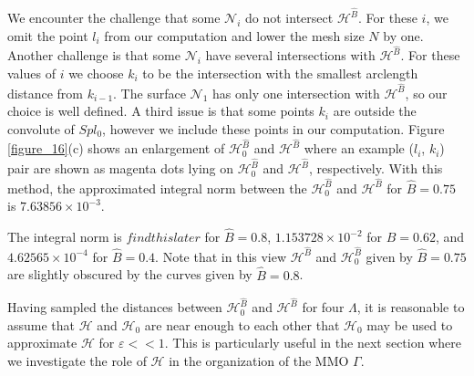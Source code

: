 \documentclass{ws-ijbc}
\begin{document}
We encounter the challenge that some $\mathscr{N}_i$ do not intersect $\mathscr{H}^{\widehat{B}}$.  For these $i$, we omit the point $l_i$ from our computation and lower the mesh size $N$ by one.  Another challenge is that some $\mathscr{N}_i$ have several intersections with $\mathscr{H}^{\widehat{B}}$.  For these values of $i$ we choose $k_i$ to be the intersection with the smallest arclength distance from $k_{i-1}$.  The surface $\mathscr{N}_1$ has only one intersection with $\mathscr{H}^{\widehat{B}}$, so our choice is well defined.  A third issue is that some points $k_i$ are outside the convolute of $Spl_0$, however we include these points in our computation.  Figure \ref{figure_16}(c) shows an enlargement of $\mathscr{H}_0^{\widehat{B}}$ and $\mathscr{H}^{\widehat{B}}$ where an example ($l_i$, $k_i$) pair are shown as magenta dots lying on $\mathscr{H}_0^{\widehat{B}}$ and $\mathscr{H}^{\widehat{B}}$, respectively.  With this method, the approximated integral norm between the $\mathscr{H}_0^{\widehat{B}}$ and $\mathscr{H}^{\widehat{B}}$ for $\widehat{B} = 0.75$ is $7.63856 \times 10^{-3}$.



























  The integral norm is $findthislater$ for $\widehat{B} = 0.8$, $1.153728 \times 10^{-2}$ for $\widehat{B} = 0.62$, and $4.62565 \times 10^{-4}$ for $\widehat{B} = 0.4$.  Note that in this view $\mathscr{H}^{\widehat{B}}$ and $\mathscr{H}_0^{\widehat{B}}$ given by $\widehat{B}=0.75$ are slightly obscured by the curves given by $\widehat{B}=0.8$.

Having sampled the distances between $\mathscr{H}_0^{\widehat{B}}$ and $\mathscr{H}^{\widehat{B}}$ for four $\Lambda$, it is reasonable to assume that $\mathscr{H}$ and $\mathscr{H}_0$ are near enough to each other that $\mathscr{H}_0$ may be used to approximate $\mathscr{H}$ for $\varepsilon << 1$.  This is particularly useful in the next section where we investigate the role of $\mathscr{H}$ in the organization of the MMO $\Gamma$.




\newpage

\end{document}
